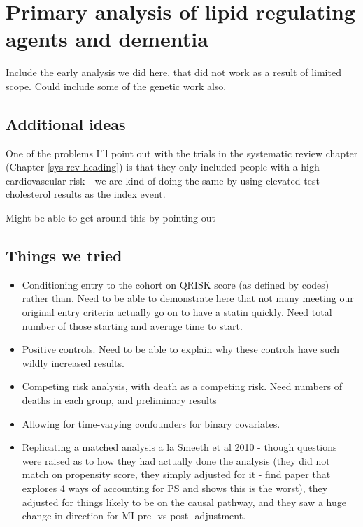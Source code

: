 \documentclass[a4paper, twoside]{templates/ociamthesis}
\providecommand{\tightlist}{%
  \setlength{\itemsep}{0pt}\setlength{\parskip}{0pt}}
\begin{document}
\hypertarget{cprd-analysis-heading}{%
\chapter{Primary analysis of lipid regulating agents and dementia}\label{cprd-analysis-heading}}

\minitoc 

Include the early analysis we did here, that did not work as a result of limited scope. Could include some of the genetic work also.

\hypertarget{additional-ideas-2}{%
\section{Additional ideas}\label{additional-ideas-2}}

One of the problems I'll point out with the trials in the systematic review chapter (Chapter \ref{sys-rev-heading}) is that they only included people with a high cardiovascular risk - we are kind of doing the same by using elevated test cholesterol results as the index event.

Might be able to get around this by pointing out

\hypertarget{things-we-tried}{%
\section{Things we tried}\label{things-we-tried}}

\begin{itemize}
\tightlist
\item
  Conditioning entry to the cohort on QRISK score (as defined by codes) rather than. Need to be able to demonstrate here that not many meeting our original entry criteria actually go on to have a statin quickly. Need total number of those starting and average time to start.
\item
  Positive controls. Need to be able to explain why these controls have such wildly increased results.
\item
  Competing risk analysis, with death as a competing risk. Need numbers of deaths in each group, and preliminary results
\item
  Allowing for time-varying confounders for binary covariates.
\item
  Replicating a matched analysis a la Smeeth et al 2010 - though questions were raised as to how they had actually done the analysis (they did not match on propensity score, they simply adjusted for it - find paper that explores 4 ways of accounting for PS and shows this is the worst), they adjusted for things likely to be on the causal pathway, and they saw a huge change in direction for MI pre- vs post- adjustment.
\end{itemize}
\end{document}
